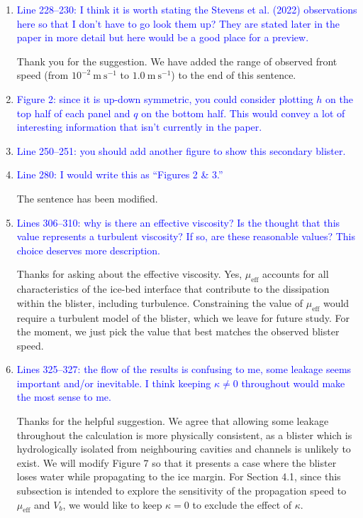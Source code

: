 \documentclass[11pt]{article}
\begin{document}
\begin{enumerate}
\item \textcolor{blue}{Line 228--230: I think it is worth stating the Stevens et al. (2022) observations here so that I don’t have to go look them up? They are stated later in the paper in more detail but here would be a good place for a preview.}

Thank you for the suggestion. We have added the range of observed front speed (from $10^{-2}~\text{m}~\text{s}^{-1}$ to $1.0~\text{m}~\text{s}^{-1}$) to the end of this sentence.

\item \textcolor{blue}{Figure 2: since it is up-down symmetric, you could consider plotting $h$ on the top half of each panel and $q$ on the bottom half. This would convey a lot of interesting information that isn’t currently in the paper.}

\item \textcolor{blue}{Line 250--251: you should add another figure to show this secondary blister.}

\item \textcolor{blue}{Line 280: I would write this as ``Figures 2 \& 3.''}

The sentence has been modified.

\item \textcolor{blue}{Lines 306--310: why is there an effective viscosity? Is the thought that this value represents a turbulent viscosity? If so, are these reasonable values? This choice deserves more description.}

Thanks for asking about the effective viscosity. Yes, $\mu_{\text{eff}}$ accounts for all characteristics of the ice-bed interface that contribute to the dissipation within the blister, including turbulence. Constraining the value of $\mu_{\text{eff}}$ would require a turbulent model of the blister, which we leave for future study. For the moment, we just pick the value that best matches the observed blister speed.

\item \textcolor{blue}{Lines 325--327: the flow of the results is confusing to me, some leakage seems important and/or inevitable. I think keeping $\kappa \neq 0$ throughout would make the most sense to me.}

Thanks for the helpful suggestion. We agree that allowing some leakage throughout the calculation is more physically consistent, as a blister which is hydrologically isolated from neighbouring cavities and channels is unlikely to exist. We will modify Figure 7 so that it presents a case where the blister loses water while propagating to the ice margin. For Section 4.1, since this subsection is intended to explore the sensitivity of the propagation speed to $\mu_{\text{eff}}$ and $V_b$, we would like to keep $\kappa=0$ to exclude the effect of $\kappa$.


\end{enumerate}
\end{document}

